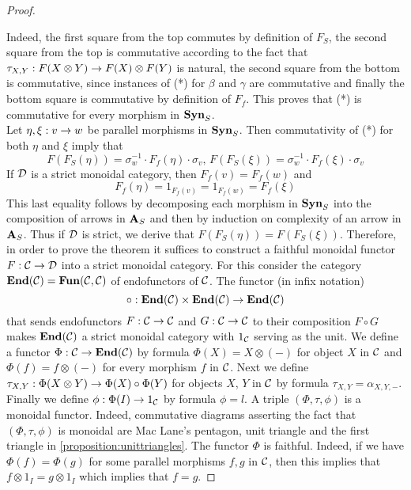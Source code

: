 \begin{proof}
\begin{center}
\end{center}
Indeed, the first square from the top commutes by definition of $F_S$, the second square from the top is commutative according to the fact that $\tau_{X,Y}:F(X\otimes Y)\rightarrow F(X)\otimes F(Y)$ is natural, the second square from the bottom is commutative, since instances of (*) for $\beta$ and $\gamma$ are commutative and finally the bottom square is commutative by definition of $F_f$. This proves that (*) is commutative for every morphism in $\mathbf{Syn}_S$.\\
Let $\eta, \xi:v\rightarrow w$ be parallel morphisms in $\mathbf{Syn}_S$. Then commutativity of (*) for both $\eta$ and $\xi$ imply that
$$F(F_S(\eta)) = \sigma_w^{-1}\cdot F_f(\eta)\cdot \sigma_v,\,F(F_S(\xi)) = \sigma_w^{-1}\cdot F_f(\xi)\cdot \sigma_v$$
If ${\mathcal D}$ is a strict monoidal category, then $F_f(v) = F_f(w)$ and
$$F_f(\eta) = 1_{F_f(v)}=1_{F_f(w)}= F_f(\xi)$$
This last equality follows by decomposing each morphism in $\mathbf{Syn}_S$ into the composition of arrows in $\mathbf{A}_S$ and then by induction on complexity of an arrow in $\mathbf{A}_S$. Thus if ${\mathcal D}$ is strict, we derive that $F(F_S(\eta)) = F(F_S(\xi))$. Therefore, in order to prove the theorem it suffices to construct a faithful monoidal functor $F:{\mathcal C}\rightarrow {\mathcal D}$ into a strict monoidal category. For this consider the category $\mathbf{End}({\mathcal C}) = \mathbf{Fun}({\mathcal C},{\mathcal C})$ of endofunctors of ${\mathcal C}$. The functor (in infix notation)
$$\circ:\mathbf{End}({\mathcal C})\times \mathbf{End}({\mathcal C})\rightarrow \mathbf{End}({\mathcal C})$$
that sends endofunctors $F:{\mathcal C}\rightarrow {\mathcal C}$ and $G:{\mathcal C}\rightarrow {\mathcal C}$ to their composition $F\circ G$ makes $\mathbf{End}({\mathcal C})$ a strict monoidal category with $1_{{\mathcal C}}$ serving as the unit. We define a functor $\Phi:{\mathcal C}\rightarrow \mathbf{End}({\mathcal C})$ by formula $\Phi(X) = X\otimes (-)$ for object $X$ in ${\mathcal C}$ and $\Phi(f) = f\otimes(-)$ for every morphism $f$ in ${\mathcal C}$. Next we define $\tau_{X,Y}:\Phi(X\otimes Y)\rightarrow \Phi(X)\circ \Phi(Y)$ for objects $X$, $Y$ in ${\mathcal C}$ by formula $\tau_{X,Y} = \alpha_{X,Y,-}$. Finally we define $\phi:\Phi(I)\rightarrow 1_{{\mathcal C}}$ by formula $\phi = l$. A triple $(\Phi,\tau,\phi)$ is a monoidal functor. Indeed, commutative diagrams asserting the fact that $(\Phi,\tau,\phi)$ is monoidal are Mac Lane's pentagon, unit triangle and the first triangle in \ref{proposition:unittriangles}. The functor $\Phi$ is faithful. Indeed, if we have $\Phi(f) = \Phi(g)$ for some parallel morphisms $f, g$ in ${\mathcal C}$, then this implies that $f\otimes 1_I = g\otimes 1_I$ which implies that $f=g$.
\end{proof}

